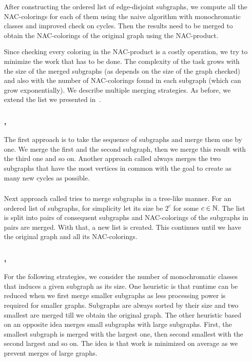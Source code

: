 After constructing the ordered list of edge-disjoint subgraphs,
we compute all the NAC-colorings for each of them using
the naive algorithm with monochromatic classes
and improved check on cycles.
Then the results need to be merged to obtain the NAC-colorings of the original graph
using the NAC-product.

Since checking every coloring in the NAC-product is a costly operation,
we try to minimize the work that has to be done.
The complexity of the task grows with the size of
the merged subgraphs (as \IsNACColoring{} depends on the size of the graph checked)
and also with the number of NAC-colorings found in each subgraph
(which can grow exponentially).
We describe multiple merging strategies.
As before, we extend the list we presented in~\cite{my_paper}.

\subsubsection*{\MergeLinear{}, \SharedVertices{}}

The first approach \MergeLinear{} is
to take the sequence of subgraphs and merge them one by one.
We merge the first and the second subgraph, then we merge this result with the
third one and so on.
%
Another approach called \SharedVertices{} always merges the two subgraphs that
have the most vertices in common with the goal
to create as many new cycles as possible.

\subsubsection*{\Log{}}

Next approach called \Log{} tries to merge subgraphs in a tree-like manner.
For an ordered list of subgraphs,
for simplicity let its size be \( 2^c \) for some \( c \in \mathbb{N} \).
The list is split into pairs of consequent subgraphs and NAC-colorings
of the subgraphs in pairs are merged. With that, a new list is created.
This continues until we have the original graph and all its NAC-colorings.

\subsubsection*{\SortedBits{}, \MinMax{}}

For the following strategies,
we consider the number of monochromatic classes
that induces a given subgraph as its size.
%
One heuristic \SortedBits{} is that runtime can be reduced
when we first merge smaller subgraphs as less processing power is
required for smaller graphs.
Subgraphs are always sorted by their size and two smallest are merged
till we obtain the original graph.
%
The other heuristic \MinMax{} based on an opposite idea
merges small subgraphs with large subgraphs.
First, the smallest subgraph is merged with the largest one,
then second smallest with the second largest and so on.
The idea is that work is minimized on average
as we prevent merges of large graphs.

